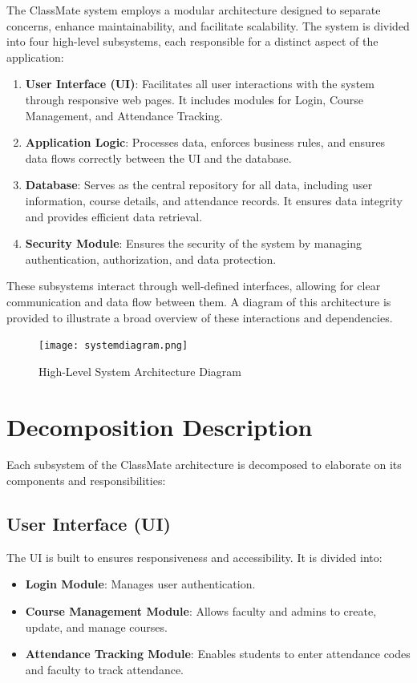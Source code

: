\documentclass[letterpaper,12pt,oneside,listof=totoc]{scrreprt}
\begin{document}
The ClassMate system employs a modular architecture designed to separate concerns, enhance maintainability, and facilitate scalability. The system is divided into four high-level subsystems, each responsible for a distinct aspect of the application:

\begin{enumerate}
    \item \textbf{User Interface (UI)}: Facilitates all user interactions with the system through responsive web pages. It includes modules for Login, Course Management, and Attendance Tracking.
    \item \textbf{Application Logic}: Processes data, enforces business rules, and ensures data flows correctly between the UI and the database.
    \item \textbf{Database}: Serves as the central repository for all data, including user information, course details, and attendance records. It ensures data integrity and provides efficient data retrieval.
    \item \textbf{Security Module}: Ensures the security of the system by managing authentication, authorization, and data protection.
\end{enumerate}

These subsystems interact through well-defined interfaces, allowing for clear communication and data flow between them. A diagram of this architecture is provided to illustrate a broad overview of these interactions and dependencies. 

\begin{figure}[H]
    \centering
    \texttt{[image: systemdiagram.png]}
    \caption{High-Level System Architecture Diagram}
    \label{fig:system_architecture}
\end{figure}

\section{Decomposition Description}

Each subsystem of the ClassMate architecture is decomposed to elaborate on its components and responsibilities:

\subsection{User Interface (UI)}
The UI is built to ensures responsiveness and accessibility. It is divided into:
\begin{itemize}
    \item \textbf{Login Module}: Manages user authentication.
    \item \textbf{Course Management Module}: Allows faculty and admins to create, update, and manage courses.
    \item \textbf{Attendance Tracking Module}: Enables students to enter attendance codes and faculty to track attendance.
\end{itemize}
\end{document}
